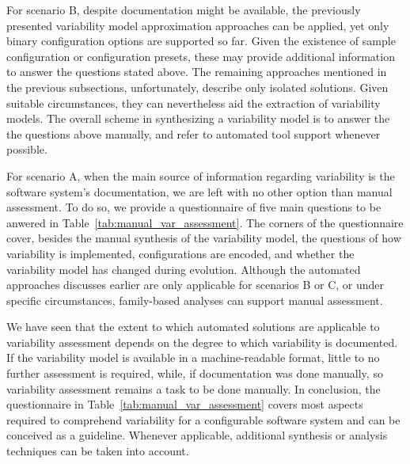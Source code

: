 For scenario B, despite documentation might be available, the
previously presented variability model approximation approaches
\citep{haslinger_reverse_2011,haslinger_extracting_2013,lopez-herrejon_reverse_2012,linsbauer_feature_2014}
can be applied, yet only binary configuration options are supported so far.
Given the existence of sample configuration or configuration presets, these
may provide additional information to answer the questions stated above. 
The remaining approaches mentioned in the previous subsections, unfortunately,
describe only isolated solutions. Given suitable circumstances, they can
nevertheless aid the extraction of variability models. The overall scheme in
synthesizing a variability model is to answer the the questions above manually,
and refer to automated tool support whenever possible.

For scenario A, when the main source of information regarding variability is
the software system's documentation, we are left with no other option than manual
assessment. To do so, we provide a questionnaire of
five main questions to be anwered in Table~\ref{tab:manual_var_assessment}.
The corners of the questionnaire cover, besides the manual synthesis of the
variability model, the questions of how variability is implemented,
configurations are encoded, and whether the variability model has changed
during evolution. Although the automated approaches discusses earlier are only
applicable for scenarios B or C, or under specific circumstances, family-based
analyses can support manual assessment.

We have seen that the extent to which automated solutions are applicable to
variability assessment depends on the degree to which variability is
documented. If the variability model is available  in a machine-readable
format, little to no further assessment is required, while, if documentation was
done manually, so variability assessment remains a task to be done manually. 
In conclusion, the questionnaire in Table~\ref{tab:manual_var_assessment} covers
most aspects required to comprehend variability for a configurable software system and can be
conceived as a guideline. Whenever applicable, additional synthesis or analysis
techniques can be taken into account.

